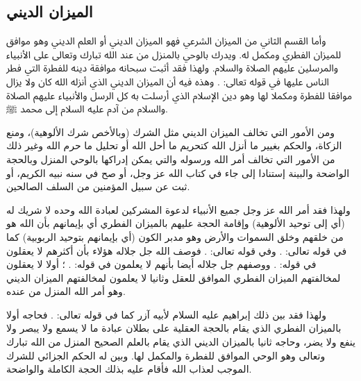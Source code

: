 \subsection{الميزان الديني}

وأما القسم الثاني من الميزان الشرعي فهو الميزان الديني أو العلم الديني وهو موافق للميزان الفطري ومكمل له. ويدرك بالوحي بالمنزل من عند الله تبارك وتعالى على الأنبياء والمرسلين عليهم الصلاة والسلام. ولهذا فقد أثبت سبحانه موافقة دينه للفطرة التي فطر الناس عليها في قوله تعالى: 
\quranayah*[30][30]{\footnotesize \surahname*[30]}. وهذه فيه أن الميزان الديني الذي أنزله الله كان ولا يزال موافقا للفطرة ومكملا لها وهو دين الإسلام الذي أرسلت به كل الرسل والأنبياء عليهم الصلاة والسلام من آدم عليه السلام إلى محمد ﷺ.

ومن الأمور التي تخالف الميزان الديني مثل الشرك (وبالأخص شرك الألوهية)، ومنع الزكاة، والحكم بغيير ما أنزل الله كتحريم ما أحل الله أو تحليل ما حرم الله وغير ذلك من الأمور التي تخالف أمر الله ورسوله والتي يمكن إدراكها بالوحي المنزل وبالحجة الواضحة والبينة إستنادا إلى جاء في كتاب الله عز وجل، أو صح في سنه نبيه الكريم، أو ثبت عن سبيل المؤمنين من السلف الصالحين. 

ولهذا فقد أمر الله عز وجل جميع الأنبياء لدعوة المشركين لعبادة الله وحده لا شريك له (أي إلى توحيد الألوهية) وإقامة الحجة عليهم بالميزان الفطري أي بإيمانهم بأن الله هو من خلقهم وخلق السموات والأرض وهو مدبر الكون (أي بإيمانهم بتوحيد الربوبية) كما في قوله تعالى:
\quranayah*[39][38]{\footnotesize \surahname*[39]}.
وفي قوله تعالى: 
\quranayah*[43][87]{\footnotesize \surahname*[43]}. فوصف الله جل جلاله هؤلاء بأن أكثرهم لا يعقلون في قوله:
\quranayah*[29][63]{\footnotesize \surahname*[29]}.
ووصفهم جل جلاله أيضا بأنهم لا يعلمون في قوله:
\quranayah*[31][25]{\footnotesize \surahname*[31]}.
؛ أولا لا يعقلون لمخالفتهم الميزان الفطري الموافق للعقل وثانيا لا يعلمون لمخالفتهم الميزان الديني وهو أمر الله المنزل من عنده. 

ولهذا فقد بين ذلك إبراهيم عليه السلام لأبيه آزر كما في قوله تعالى:
\quranayah*[19][42-45]{\footnotesize \surahname*[19]}. فحاجه أولا بالميزان الفطري الذي يقام بالحجة العقلية على بطلان عبادة ما لا يسمع ولا يبصر ولا ينفع ولا يضر، وحاجه ثانيا بالميزان الديني الذي يقام بالعلم الصحيح المنزل من الله تبارك وتعالى وهو الوحي الموافق للفطرة والمكمل لها. وبين له الحكم الجزائي للشرك الموجب لعذاب الله فأقام عليه بذلك الحجة الكاملة والواضحة. 

